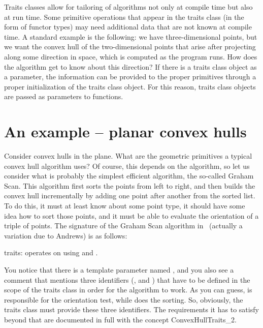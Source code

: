 Traits classes allow for tailoring of algorithms not only at compile
time but also at run time.  Some primitive operations that appear in
the traits class (in the form of functor types) may need additional
data that are not known at compile time.  A standard example is the
following: we have three-dimensional points, but we want the convex
hull of the two-dimensional points that arise after projecting along
some direction in space, which is computed as the program runs. How
does the algorithm get to know about this direction? If there is a
traits class object as a parameter, the information can be provided to
the proper primitives through a proper initialization of the traits
class object.  For this reason, traits class objects are passed as
parameters to functions.

\section{An example -- planar convex hulls}
\label{sec:traits_class_example}

Consider convex hulls in the plane. What are the geometric primitives a 
typical 
convex hull algorithm uses? Of course, this depends on the algorithm, so
let us consider what is probably the simplest efficient algorithm, the 
so-called Graham Scan. This algorithm first sorts the points from left to right,
and then builds the convex hull incrementally by adding one point after
another from the sorted list. To do this, it must at least know about 
some point type, it should have some idea how to sort those points, and
it must be able to evaluate the orientation of a triple of points. The
signature of the Graham Scan algorithm in \cgal\ (actually a variation 
due to Andrews) is as follows:

\ccAutoIndexingOff
{}
           {{\sc traits}: operates on  using
             and 
            .
           }
\ccAutoIndexingOn

You notice that there is a template parameter named , 
and you also see a comment that mentions three identifiers (, 
 and ) that have to be defined in the
scope of the traits class in order for the algorithm to work.
As you can guess,  is responsible for the orientation 
test, while  does the sorting. So, obviously, the traits class
must provide these three identifiers. The requirements it has to satisfy
beyond that are documented in full with the concept ConvexHullTraits\_2.


